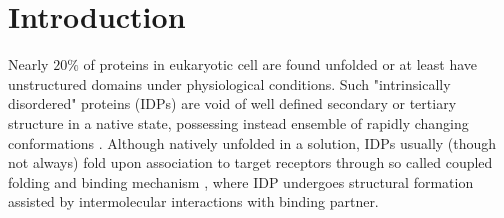 \documentclass[../talant.diss.submit.tex]{subfiles}
\begin{document}
\label{chap:chapter3}
%
\section{\textbf{Introduction}}\label{sect:three_one}
Nearly $20\%$ of proteins in eukaryotic cell are found unfolded or at least have unstructured domains
under physiological conditions. Such "intrinsically disordered" proteins (IDPs) are void of well defined
secondary or tertiary structure in a native state, possessing instead ensemble of rapidly changing conformations
\cite{wright:99,dunker:01}. Although natively unfolded in a solution, IDPs usually
(though not always\cite{sigalov:07bin,chakrabortee:10cat})
fold upon association to target receptors through so called coupled folding and binding mechanism
\cite{wright:99,sugase:07,huang:09,turjanski:08}, where IDP undergoes structural formation assisted by
intermolecular interactions with binding partner.
%
%
\end{document}
